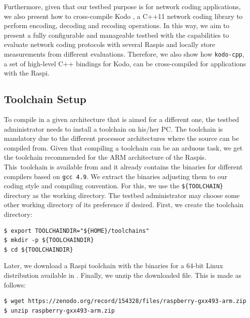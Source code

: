 \documentclass[electronics,article,accept,moreauthors,pdftex,10pt,a4paper]{mdpi}
\theoremstyle{mdpi}
\newcounter{ex}
\newcounter{re}
\theoremstyle{mdpidefinition}
\begin{document}
Furthermore, given that our testbed purpose is for
network coding applications, we also present how to cross-compile Kodo
\cite{kodo2011pedersen}, a C++11 network coding library to perform
encoding, decoding and recoding operations. In this way, we aim to present
a fully configurable and manageable testbed with the capabilities to
evaluate network coding protocols with several Raspis and locally
store measurements from different evaluations. Therefore, we also show
how \texttt{kodo-cpp}, a set of high-level C++ bindings for Kodo, can be
cross-compiled for applications with the Raspi.

\subsection{Toolchain Setup}
To compile in a given architecture that is aimed for a different one,
the testbed administrator needs to install a toolchain on his/her PC.
The toolchain is mandatory due to the different processor architectures
where the source can be compiled from.
Given that compiling a toolchain can be an arduous task, we get the toolchain
recommended for the ARM architecture of the Raspis.
This~toolchain is available from \cite{soerensen_chres_wiant_2016_154143} and
it already contains the binaries for different compilers based on
\texttt{gcc 4.9}. We extract the binaries adjusting
them to our coding style and compiling convention. For this, we use the
\texttt{\$\{TOOLCHAIN\}} directory as the working directory.
The testbed administrator may choose some other working directory of
its preference if desired. First, we create the toolchain directory:

\begin{lstlisting}[]
$ export TOOLCHAINDIR="${HOME}/toolchains"
$ mkdir -p ${TOOLCHAINDIR}
$ cd ${TOOLCHAINDIR}
\end{lstlisting}
\FloatBarrier
\vspace{-5mm}

Later, we download a Raspi toolchain with the binaries for a 64-bit Linux
distribution available in \cite{soerensen_chres_wiant_2016_154143}. Finally, we unzip the
downloaded file. This is made as follows:

\begin{lstlisting}[]
$ wget https://zenodo.org/record/154328/files/raspberry-gxx493-arm.zip
$ unzip raspberry-gxx493-arm.zip
\end{lstlisting}
\FloatBarrier
\vspace{-5mm}
\end{document}
